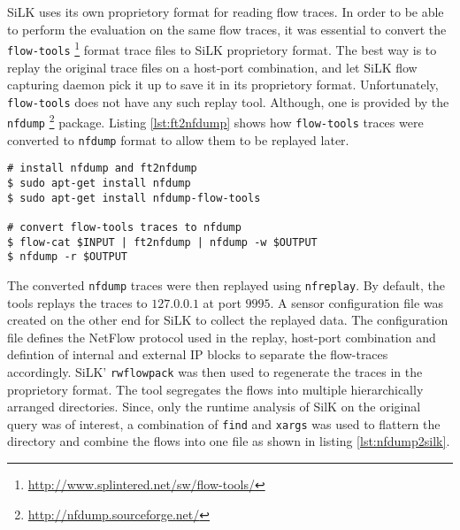 SiLK uses its own proprietory format for reading flow traces. In order to be
able to perform the evaluation on the same flow traces, it was essential to
convert the \texttt{flow-tools}
\footnote{\url{http://www.splintered.net/sw/flow-tools/}} format trace files
to SiLK proprietory format. The best way is to replay the original trace files
on a  host-port combination, and let SiLK flow
capturing daemon pick it up to save it in its proprietory format.
Unfortunately, \texttt{flow-tools} does not have any such replay tool.
Although, one is provided by the \texttt{nfdump}
\footnote{\url{http://nfdump.sourceforge.net/}} package. Listing
\ref{lst:ft2nfdump} shows how \texttt{flow-tools} traces were converted to
\texttt{nfdump} format to allow them to be replayed later.

\begin{lstlisting}
# install nfdump and ft2nfdump
$ sudo apt-get install nfdump
$ sudo apt-get install nfdump-flow-tools

# convert flow-tools traces to nfdump
$ flow-cat $INPUT | ft2nfdump | nfdump -w $OUTPUT
$ nfdump -r $OUTPUT
\end{lstlisting}

The converted \texttt{nfdump} traces were then replayed using
\texttt{nfreplay}. By default, the tools replays the traces to $127.0.0.1$ at
port $9995$. A sensor configuration file was created on the other end for SiLK
to collect the replayed data. The configuration file defines the NetFlow
protocol used in the replay, host-port combination and defintion of internal
and external \ac{IP} blocks to separate  the
flow-traces accordingly. SiLK' \texttt{rwflowpack} was then used to regenerate
the traces in the proprietory format. The tool segregates the flows into
multiple hierarchically arranged directories. Since, only the runtime analysis
of SilK on the original query was of interest, a combination of \texttt{find}
and \texttt{xargs} was used to flattern the directory and combine the flows
into one file as shown in listing \ref{lst:nfdump2silk}.

